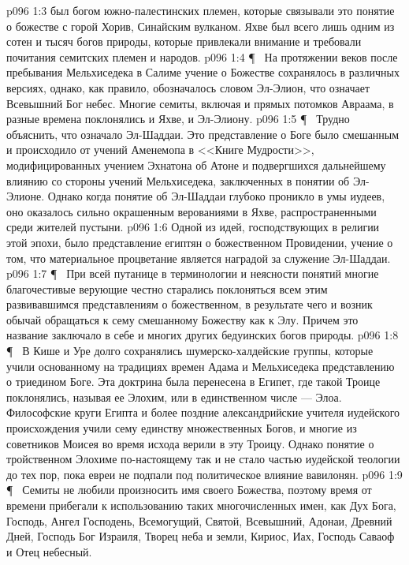 \vs p096 1:3 \bibnobreakspace {} был богом южно\hyp{}палестинских племен, которые связывали это понятие о божестве с горой Хорив, Синайским вулканом. Яхве был всего лишь одним из сотен и тысяч богов природы, которые привлекали внимание и требовали почитания семитских племен и народов.
\vs p096 1:4 \P\ \bibnobreakspace {} На протяжении веков после пребывания Мельхиседека в Салиме учение о Божестве сохранялось в различных версиях, однако, как правило, обозначалось словом Эл\hyp{}Элион, что означает Всевышний Бог небес. Многие семиты, включая и прямых потомков Авраама, в разные времена поклонялись и Яхве, и Эл\hyp{}Элиону.
\vs p096 1:5 \P\ \bibnobreakspace {} Трудно объяснить, что означало Эл\hyp{}Шаддаи. Это представление о Боге было смешанным и происходило от учений Аменемопа в <<Книге Мудрости>>, модифицированных учением Эхнатона об Атоне и подвергшихся дальнейшему влиянию со стороны учений Мельхиседека, заключенных в понятии об Эл\hyp{}Элионе. Однако когда понятие об Эл\hyp{}Шаддаи глубоко проникло в умы иудеев, оно оказалось сильно окрашенным верованиями в Яхве, распространенными среди жителей пустыни.
\vs p096 1:6 Одной из идей, господствующих в религии этой эпохи, было представление египтян о божественном Провидении, учение о том, что материальное процветание является наградой за служение Эл\hyp{}Шаддаи.
\vs p096 1:7 \P\ \bibnobreakspace {} При всей путанице в терминологии и неясности понятий многие благочестивые верующие честно старались поклоняться всем этим развивавшимся представлениям о божественном, в результате чего и возник обычай обращаться к сему смешанному Божеству как к Элу. Причем это название заключало в себе и многих других бедуинских богов природы.
\vs p096 1:8 \P\ \bibnobreakspace {} В Кише и Уре долго сохранялись шумерско\hyp{}халдейские группы, которые учили основанному на традициях времен Адама и Мельхиседека представлению о триедином Боге. Эта доктрина была перенесена в Египет, где такой Троице поклонялись, называя ее Элохим, или в единственном числе --- Элоа. Философские круги Египта и более поздние александрийские учителя иудейского происхождения учили сему единству множественных Богов, и многие из советников Моисея во время исхода верили в эту Троицу. Однако понятие о тройственном Элохиме по\hyp{}настоящему так и не стало частью иудейской теологии до тех пор, пока евреи не подпали под политическое влияние вавилонян.
\vs p096 1:9 \P\ \bibnobreakspace {} Семиты не любили произносить имя своего Божества, поэтому время от времени прибегали к использованию таких многочисленных имен, как Дух Бога, Господь, Ангел Господень, Всемогущий, Святой, Всевышний, Адонаи, Древний Дней, Господь Бог Израиля, Творец неба и земли, Кириос, Иах, Господь Саваоф и Отец небесный.
